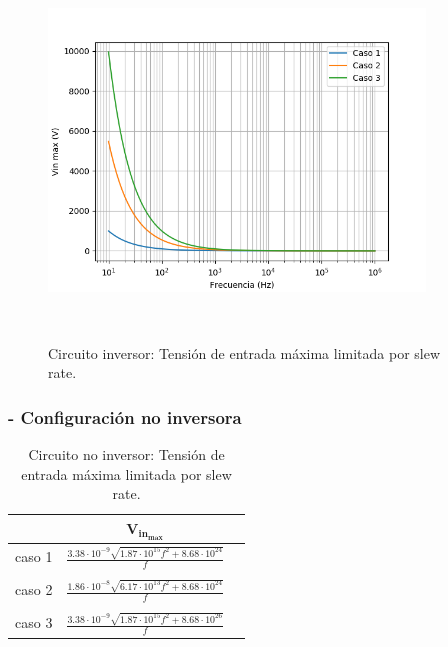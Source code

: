 \begin{figure}[H] %
	\centering
	\includegraphics[width=10cm,height=10cm,keepaspectratio]{../EJ1/00GRAFICOS/teoricos/c1sr.png}
	\caption{Circuito inversor: Tensi\'on de entrada m\'axima limitada por slew rate.}
	\label{c1sr}
\end{figure}

\subsubsection*{- Configuraci\'on no inversora}

\begin{table}[h!]
	\centering
	\begin{tabular}{c c c }%
		\bfseries  & $\bm{V_{in_{max}}}$ \\ \hline
		caso 1 & $\frac{3.38 \cdot 10^{-9} \sqrt{1.87 \cdot 10^{15} f^{2} + 8.68 \cdot 10^{24}}}{f}$ \\ \\
		caso 2 & $\frac{1.86 \cdot 10^{-8} \sqrt{6.17 \cdot 10^{13}f^{2} + 8.68 \cdot 10^{24}}}{f}$ \\ \\
		caso 3 & $\frac{3.38 \cdot 10^{-9} \sqrt{1.87 \cdot 10^{15} f^{2} + 8.68 \cdot 10^{26}}}{f}$ \\
		\hline
	\end{tabular}
	\caption{Circuito no inversor: Tensi\'on de entrada m\'axima limitada por slew rate.}
	\label{vin_max}
\end{table}

